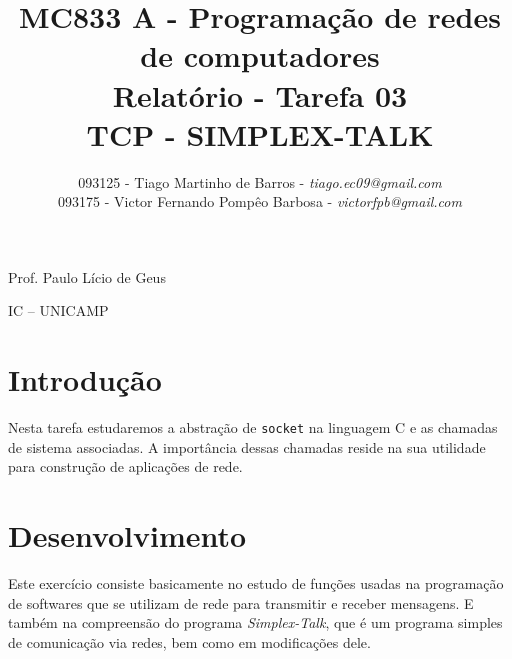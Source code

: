 \documentclass[a4paper,10pt]{article}
\begin{document}


\title{MC833 A - Programação de redes de computadores\\
Relatório - Tarefa 03\\
TCP - SIMPLEX-TALK}

\author {   093125 - Tiago Martinho de Barros - \textit{tiago.ec09@gmail.com}\\
            093175 - Victor Fernando Pompêo Barbosa - \textit{victorfpb@gmail.com}}


\maketitle

\centerline{Prof. Paulo Lício de Geus}
\centerline{IC -- UNICAMP}

\vspace{2cm}
\tableofcontents
    
\newpage
\section{Introdução}
\hspace{14pt}

    Nesta tarefa estudaremos a abstração de {\tt socket} na linguagem C e as chamadas de sistema associadas. A importância dessas chamadas reside na sua utilidade para construção de aplicações de rede.


\section{Desenvolvimento}

Este exercício consiste basicamente no estudo de funções usadas na programação de softwares que se utilizam de rede para transmitir e receber mensagens. E também na compreensão do programa \textit{Simplex-Talk}, que é um programa simples de comunicação via redes, bem como em modificações dele.
\end{document}
